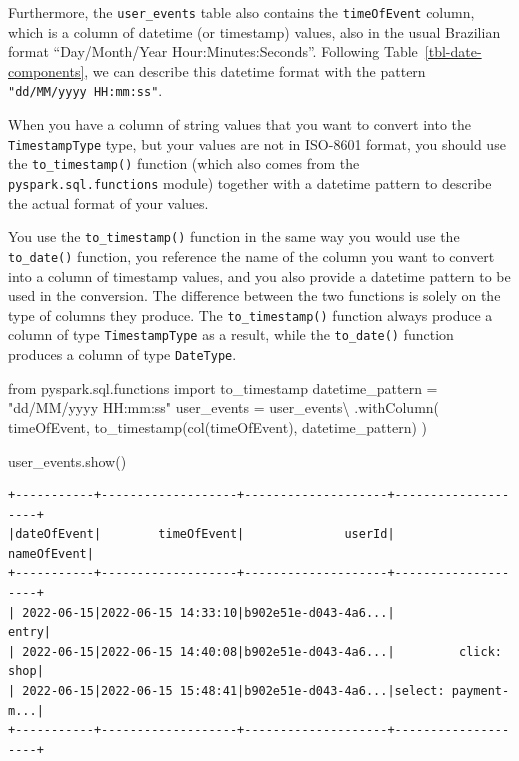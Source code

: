 \documentclass[
  11pt,
  letterpaper,
  DIV=11,
  numbers=noendperiod]{scrreprt}
\newenvironment{Shaded}{\begin{snugshade}}{\end{snugshade}}
\newcommand{\ImportTok}[1]{\textcolor[rgb]{0.00,0.46,0.62}{#1}}
\newcommand{\NormalTok}[1]{\textcolor[rgb]{0.00,0.23,0.31}{#1}}
\newcommand{\OperatorTok}[1]{\textcolor[rgb]{0.37,0.37,0.37}{#1}}
\newcommand{\StringTok}[1]{\textcolor[rgb]{0.13,0.47,0.30}{#1}}
\begin{document}
Furthermore, the \texttt{user\_events} table also contains the
\texttt{timeOfEvent} column, which is a column of datetime (or
timestamp) values, also in the usual Brazilian format ``Day/Month/Year
Hour:Minutes:Seconds''. Following Table~\ref{tbl-date-components}, we
can describe this datetime format with the pattern
\texttt{"dd/MM/yyyy\ HH:mm:ss"}.

When you have a column of string values that you want to convert into
the \texttt{TimestampType} type, but your values are not in ISO-8601
format, you should use the \texttt{to\_timestamp()} function (which also
comes from the \texttt{pyspark.sql.functions} module) together with a
datetime pattern to describe the actual format of your values.

You use the \texttt{to\_timestamp()} function in the same way you would
use the \texttt{to\_date()} function, you reference the name of the
column you want to convert into a column of timestamp values, and you
also provide a datetime pattern to be used in the conversion. The
difference between the two functions is solely on the type of columns
they produce. The \texttt{to\_timestamp()} function always produce a
column of type \texttt{TimestampType} as a result, while the
\texttt{to\_date()} function produces a column of type
\texttt{DateType}.

\begin{Shaded}
\begin{Highlighting}[]
\ImportTok{from}\NormalTok{ pyspark.sql.functions }\ImportTok{import}\NormalTok{ to\_timestamp}
\NormalTok{datetime\_pattern }\OperatorTok{=} \StringTok{"dd/MM/yyyy HH:mm:ss"}
\NormalTok{user\_events }\OperatorTok{=}\NormalTok{ user\_events}\OperatorTok{\textbackslash{}}
\NormalTok{    .withColumn(}
        \StringTok{\textquotesingle{}timeOfEvent\textquotesingle{}}\NormalTok{,}
\NormalTok{        to\_timestamp(col(}\StringTok{\textquotesingle{}timeOfEvent\textquotesingle{}}\NormalTok{), datetime\_pattern)}
\NormalTok{    )}

\NormalTok{user\_events.show()}
\end{Highlighting}
\end{Shaded}

\begin{verbatim}
+-----------+-------------------+--------------------+--------------------+
|dateOfEvent|        timeOfEvent|              userId|         nameOfEvent|
+-----------+-------------------+--------------------+--------------------+
| 2022-06-15|2022-06-15 14:33:10|b902e51e-d043-4a6...|               entry|
| 2022-06-15|2022-06-15 14:40:08|b902e51e-d043-4a6...|         click: shop|
| 2022-06-15|2022-06-15 15:48:41|b902e51e-d043-4a6...|select: payment-m...|
+-----------+-------------------+--------------------+--------------------+
\end{verbatim}
\end{document}
